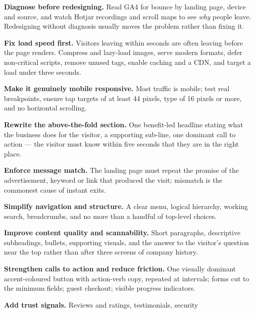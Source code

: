 \begin{qlist}
\begin{apts}
\item \textbf{Diagnose before redesigning.} Read GA4 for bounce by landing page,
      device and source, and watch Hotjar recordings and scroll maps to see
      \emph{why} people leave. Redesigning without diagnosis usually moves the
      problem rather than fixing it.
\item \textbf{Fix load speed first.} Visitors leaving within seconds are often
      leaving before the page renders. Compress and lazy-load images, serve
      modern formats, defer non-critical scripts, remove unused tags, enable
      caching and a CDN, and target a load under three seconds.
\item \textbf{Make it genuinely mobile responsive.} Most traffic is mobile;
      test real breakpoints, ensure tap targets of at least 44 pixels, type of
      16 pixels or more, and no horizontal scrolling.
\item \textbf{Rewrite the above-the-fold section.} One benefit-led headline
      stating what the business does for the visitor, a supporting sub-line, one
      dominant call to action --- the visitor must know within five seconds that
      they are in the right place.
\item \textbf{Enforce message match.} The landing page must repeat the promise
      of the advertisement, keyword or link that produced the visit; mismatch is
      the commonest cause of instant exits.
\item \textbf{Simplify navigation and structure.} A clear menu, logical
      hierarchy, working search, breadcrumbs, and no more than a handful of
      top-level choices.
\item \textbf{Improve content quality and scannability.} Short paragraphs,
      descriptive subheadings, bullets, supporting visuals, and the answer to
      the visitor's question near the top rather than after three screens of
      company history.
\item \textbf{Strengthen calls to action and reduce friction.} One visually
      dominant accent-coloured button with action-verb copy, repeated at
      intervals; forms cut to the minimum fields; guest checkout; visible
      progress indicators.
\item \textbf{Add trust signals.} Reviews and ratings, testimonials, security

\end{apts}
\end{qlist}
